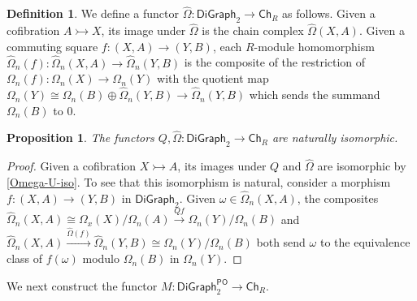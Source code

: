 \documentclass[11pt]{article}
\newtheorem{proposition}[theo]{Proposition}
\theoremstyle{definition}
\newtheorem{defi}[theo]{Definition}
\numberwithin{equation}{section}
\newcommand{\Ch}{\mathsf{Ch}}
\newcommand{\Cof}{\mathsf{DiGraph}_2}
\newcommand{\CofPO}{\mathsf{DiGraph}_2^{\mathsf{PO}}}
\newcommand{\tOmega}{\widehat{\Omega}}
\newcommand{\cto}{\rightarrowtail}
\begin{document}
\begin{defi}\label{tOmega-def}
We define a functor $\tOmega \colon \Cof \to \Ch_R$ as follows. Given a cofibration $A \cto X$, its image under $\tOmega$ is the chain complex $\tOmega(X,A)$. Given a commuting square $f \colon (X,A) \to (Y,B)$, each $R$-module homomorphism $\tOmega_n(f) \colon \tOmega_n(X,A) \to \tOmega_n(Y,B)$ is the composite of the restriction of $\Omega_n(f) \colon \Omega_n(X) \to \Omega_n(Y)$ with the quotient map $\Omega_n(Y) \cong \Omega_n(B) \oplus \tOmega_n(Y,B) \to \tOmega_n(Y,B)$ which sends the summand $\Omega_n(B)$ to $0$.
\end{defi}

\begin{proposition}\label{Omega-U}
The functors $Q, \tOmega \colon \Cof \to \Ch_R$ are naturally isomorphic.
\end{proposition}

\begin{proof}
Given a cofibration $X \cto A$, its images under $Q$ and $\tOmega$ are isomorphic by \cref{Omega-U-iso}. To see that this isomorphism is natural, consider a morphism $f \colon (X,A) \to (Y,B)$ in $\Cof$. Given $\omega \in \tOmega_n(X,A)$, the composites $\tOmega_n(X,A) \cong \Omega_x(X) / \Omega_n(A) \xrightarrow{Q f} \Omega_n(Y) / \Omega_n(B)$ and $\tOmega_n(X,A) \xrightarrow{\tOmega(f)} \tOmega_n(Y,B) \cong \Omega_n(Y) / \Omega_n(B)$ both send $\omega$ to the equivalence class of $f (\omega)$ modulo $\Omega_n(B)$ in $\Omega_n(Y)$.
\end{proof}

We next construct the functor $M \colon \CofPO \to \Ch_R$.
\end{document}
